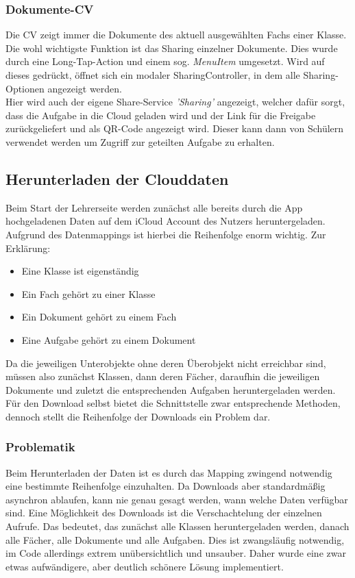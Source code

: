 \subsubsection{Dokumente-CV}
Die CV zeigt immer die Dokumente des aktuell ausgewählten Fachs einer Klasse. Die wohl wichtigste Funktion ist das Sharing einzelner Dokumente. Dies wurde durch eine Long-Tap-Action und einem sog. \textit{MenuItem} umgesetzt. Wird auf dieses gedrückt, öffnet sich ein modaler SharingController, in dem alle Sharing-Optionen angezeigt werden.\\Hier wird auch der eigene Share-Service \textit{'Sharing'} angezeigt, welcher dafür sorgt, dass die Aufgabe in die Cloud geladen wird und der Link für die Freigabe zurückgeliefert und als QR-Code angezeigt wird. Dieser kann dann von Schülern verwendet werden um Zugriff zur geteilten Aufgabe zu erhalten.

\subsection{Herunterladen der Clouddaten}
Beim Start der Lehrerseite werden zunächst alle bereits durch die App hochgeladenen Daten auf dem iCloud Account des Nutzers heruntergeladen. Aufgrund des Datenmappings ist hierbei die Reihenfolge enorm wichtig. Zur Erklärung:
\begin{itemize}
\item Eine Klasse ist eigenständig
\item Ein Fach gehört zu einer Klasse
\item Ein Dokument gehört zu einem Fach
\item Eine Aufgabe gehört zu einem Dokument
\end{itemize}
Da die jeweiligen Unterobjekte ohne deren Überobjekt nicht erreichbar sind, müssen also zunächst Klassen, dann deren Fächer, daraufhin die jeweiligen Dokumente und zuletzt die entsprechenden Aufgaben heruntergeladen werden.
Für den Download selbst bietet die Schnittstelle zwar entsprechende Methoden, dennoch stellt die Reihenfolge der Downloads ein Problem dar.

\subsubsection{Problematik}
Beim Herunterladen der Daten ist es durch das Mapping zwingend notwendig eine bestimmte Reihenfolge einzuhalten. Da Downloads aber standardmäßig asynchron ablaufen, kann nie genau gesagt werden, wann welche Daten verfügbar sind.
Eine Möglichkeit des Downloads ist die Verschachtelung der einzelnen Aufrufe. Das bedeutet, das zunächst alle Klassen heruntergeladen werden, danach alle Fächer, alle Dokumente und alle Aufgaben. Dies ist zwangsläufig notwendig, im Code allerdings extrem unübersichtlich und unsauber. Daher wurde eine zwar etwas aufwändigere, aber deutlich schönere Lösung implementiert.

